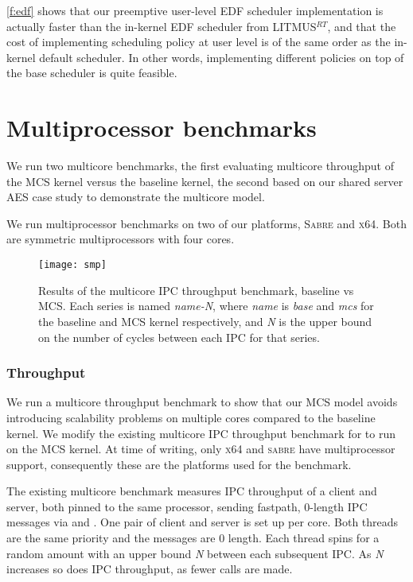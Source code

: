 \autoref{f:edf} shows that our preemptive user-level EDF scheduler implementation is
actually faster than the in-kernel EDF scheduler from LITMUS$^{RT}$, and
that the cost of implementing scheduling policy at user level is of
the same order as the in-kernel default scheduler. In other words,
implementing different policies on top of the base scheduler is quite feasible.
\clearpage
\section{Multiprocessor benchmarks}

We run two multicore benchmarks, the first evaluating multicore throughput of the MCS kernel versus the
baseline kernel, the second based on our shared server \gls{AES} case study to demonstrate the
multicore model. 

We run multiprocessor benchmarks on two of our platforms, \textsc{Sabre} and \textsc{x64}. Both 
are symmetric multiprocessors with four cores. 

\begin{figure}[t] 
    \centering
    \texttt{[image: smp]}
    \caption[Results of the multicore IPC throughput benchmark.]{Results of the multicore IPC throughput benchmark, baseline \selfour vs MCS. 
        Each series is named \textit{name-N}, where \textit{name} is \textit{base} and \textit{mcs} for 
        the baseline and MCS kernel respectively, and \textit{N} is the upper
        bound on the number of cycles between each IPC for that series.}
    \label{f:evaluation-smp}
\end{figure}

\subsubsection{Throughput}

We run a multicore throughput benchmark to show that our MCS model
avoids introducing scalability problems on multiple cores compared to the baseline kernel.
We modify the
existing multicore IPC throughput benchmark for \selfour to run on the MCS kernel. 
At time of writing, only \textsc{x64} and \textsc{sabre} have \selfour multiprocessor support, 
consequently these are the platforms used for the benchmark.

The existing multicore benchmark measures IPC throughput of a client and server, both 
pinned to the same processor, sending fastpath, 0-length IPC messages via \call
and \replyrecv. One pair of client and server is set up per core. Both threads are
the same priority and the messages are 0 length. Each thread spins for a random amount
with an upper bound \textit{N} between each subsequent IPC. As \textit{N} increases so does
IPC throughput, as fewer calls are made.

